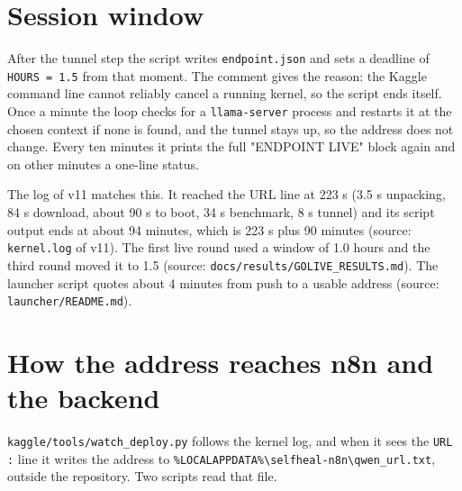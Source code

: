 \documentclass[11pt,a4paper]{report}
\begin{document}
\section{Session window}

After the tunnel step the script writes \texttt{endpoint.\allowbreak{}json} and sets a deadline of \texttt{HOURS = 1.\allowbreak{}5} from that moment. The comment gives the reason: the Kaggle command line cannot reliably cancel a running kernel, so the script ends itself. Once a minute the loop checks for a \texttt{llama-\allowbreak{}server} process and restarts it at the chosen context if none is found, and the tunnel stays up, so the address does not change. Every ten minutes it prints the full "ENDPOINT LIVE" block again and on other minutes a one-line status.

The log of v11 matches this. It reached the URL line at 223 s (3.5 s unpacking, 84 s download, about 90 s to boot, 34 s benchmark, 8 s tunnel) and its script output ends at about 94 minutes, which is 223 s plus 90 minutes (source: \texttt{kernel.\allowbreak{}log} of v11). The first live round used a window of 1.0 hours and the third round moved it to 1.5 (source: \texttt{docs/\allowbreak{}results/\allowbreak{}GOLIVE\_\allowbreak{}RESULTS.\allowbreak{}md}). The launcher script quotes about 4 minutes from push to a usable address (source: \texttt{launcher/\allowbreak{}README.\allowbreak{}md}).

\section{How the address reaches n8n and the backend}

\texttt{kaggle/\allowbreak{}tools/\allowbreak{}watch\_\allowbreak{}deploy.\allowbreak{}py} follows the kernel log, and when it sees the \texttt{URL :} line it writes the address to \texttt{\%LOCALAPPDATA\%\textbackslash{}selfheal-\allowbreak{}n8n\textbackslash{}qwen\_\allowbreak{}url.\allowbreak{}txt}, outside the repository. Two scripts read that file.
\end{document}
